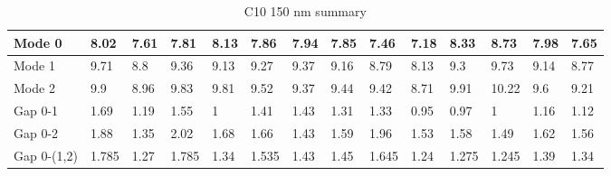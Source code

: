 \begin{table}[]
\centering
\begin{tabular}{|l|l|l|l|l|l|l|l|l|l|l|l|l|l|}
\hline
Mode 0 & 8.02 & 7.61 & 7.81 & 8.13 & 7.86 & 7.94 & 7.85 & 7.46 & 7.18 & 8.33 & 8.73 & 7.98 & 7.65 \\ \hline
Mode 1 & 9.71 & 8.8 & 9.36 & 9.13 & 9.27 & 9.37 & 9.16 & 8.79 & 8.13 & 9.3 & 9.73 & 9.14 & 8.77 \\ \hline
Mode 2 & 9.9 & 8.96 & 9.83 & 9.81 & 9.52 & 9.37 & 9.44 & 9.42 & 8.71 & 9.91 & 10.22 & 9.6 & 9.21 \\ \hline
Gap 0-1 & 1.69 & 1.19 & 1.55 & 1 & 1.41 & 1.43 & 1.31 & 1.33 & 0.95 & 0.97 & 1 & 1.16 & 1.12 \\ \hline
Gap 0-2 & 1.88 & 1.35 & 2.02 & 1.68 & 1.66 & 1.43 & 1.59 & 1.96 & 1.53 & 1.58 & 1.49 & 1.62 & 1.56 \\ \hline
Gap 0-(1,2) & 1.785 & 1.27 & 1.785 & 1.34 & 1.535 & 1.43 & 1.45 & 1.645 & 1.24 & 1.275 & 1.245 & 1.39 & 1.34 \\ \hline
\end{tabular}
\caption{C10 150 nm summary}
\label{C10summary}
\end{table}